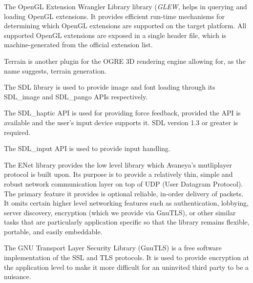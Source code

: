 
The OpenGL Extension Wrangler Library library ({\it GLEW}, helps in querying and loading OpenGL extensions. It provides efficient run-time mechanisms for determining which OpenGL extensions are supported on the target platform. All supported OpenGL extensions are exposed in a single header file, which is machine-generated from the official extension list.


Terrain is another plugin for the OGRE 3D rendering engine allowing for, as the name suggests, terrain generation.


The SDL library is used to provide image and font loading through its SDL_image and SDL_pango APIs respectively.
\stopitemize


\startitemize[3]
\setupwhitespace[big]

The SDL_haptic API is used for providing force feedback, provided the API is available and the user's input device supports it. SDL version 1.3 or greater is required.


The SDL_input API is used to provide input handling.
\stopitemize


\startitemize[3]
\setupwhitespace[big]

The ENet library provides the low level library which Avaneya's mutliplayer protocol is built upon. Its purpose is to provide a relatively thin, simple and robust network communication layer on top of UDP (User Datagram Protocol). The primary feature it provides is optional reliable, in-order delivery of packets. It omits certain higher level networking features such as authentication, lobbying, server discovery, encryption (which we provide via GnuTLS), or other similar tasks that are particularly application specific so that the library remains flexible, portable, and easily embeddable.


The GNU Transport Layer Security Library (GnuTLS) is a free software implementation of the SSL and TLS protocols. It is used to provide encryption at the application level to make it more difficult for an uninvited third party to be a nuisance.
\stopitemize

